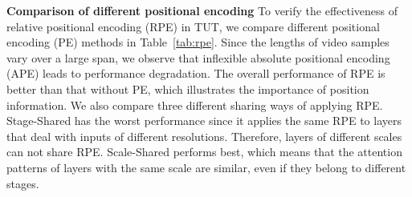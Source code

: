 \documentclass[letterpaper]{article} \usepackage[submission]{aaai23}  \usepackage{times}  \usepackage{helvet}  \usepackage{courier}  \usepackage[hyphens]{url}  \usepackage{graphicx} \urlstyle{rm} \def\UrlFont{\rm}  \usepackage{natbib}  \usepackage{caption} \frenchspacing  \setlength{\pdfpagewidth}{8.5in} \setlength{\pdfpageheight}{11in} \usepackage{algorithm}
\begin{document}
{\bf Comparison of different positional encoding}\quad
To verify the effectiveness of relative positional encoding (RPE) in TUT, we compare different positional encoding (PE) methods in Table~\ref{tab:rpe}. Since the lengths of video samples vary over a large span, we observe that inflexible absolute positional encoding (APE) leads to performance degradation. The overall performance of RPE is better than that without PE, which illustrates the importance of position information. We also compare three different sharing ways of applying RPE. Stage-Shared has the worst performance since it applies the same RPE to layers that deal with inputs of different resolutions. Therefore, layers of different scales can not share RPE. Scale-Shared performs best, which means that the attention patterns of layers with the same scale are similar, even if they belong to different stages.  

\begin{table}[t]
\centering
{}
\caption{Comparison of different architectures and attention patterns. \textit{Standard} refers to architecture without temporal sampling, where the temporal resolution of each layer is unchanged. And \textit{U-Trans} refers to our proposed architecture. \textit{Full}, \textit{LogSparse}, and \textit{Local} are three attention patterns.}
\label{tab:model}
\end{table}
\end{document}
